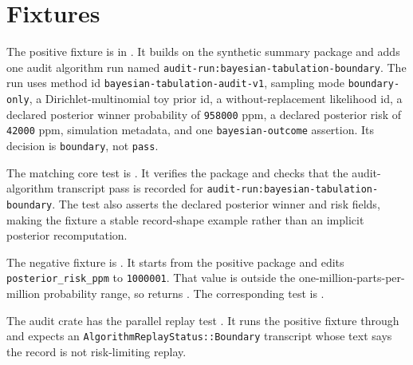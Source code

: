 \section{Fixtures}

The positive fixture is
 in
. It builds on the synthetic summary
package and adds one audit algorithm run named
\texttt{audit-run:bayesian-tabulation-boundary}. The run uses method id
\texttt{bayesian-tabulation-audit-v1}, sampling mode \texttt{boundary-only}, a
Dirichlet-multinomial toy prior id, a without-replacement likelihood id, a
declared posterior winner probability of \texttt{958000} ppm, a declared
posterior risk of \texttt{42000} ppm, simulation metadata, and one
\texttt{bayesian-outcome} assertion. Its decision is \texttt{boundary}, not
\texttt{pass}.

The matching core test is
. It
verifies the package and checks that the audit-algorithm transcript pass is
recorded for \texttt{audit-run:bayesian-tabulation-boundary}. The test also
asserts the declared posterior winner and risk fields, making the fixture a
stable record-shape example rather than an implicit posterior recomputation.

The negative fixture is
. It starts from the
positive package and edits \texttt{posterior\_risk\_ppm} to \texttt{1000001}.
That value is outside the one-million-parts-per-million probability range, so
 returns
. The corresponding test is
.

The audit crate has the parallel replay test
. It runs the
positive fixture through  and expects an
\texttt{AlgorithmReplayStatus::Boundary} transcript whose text says the record
is not risk-limiting replay.
